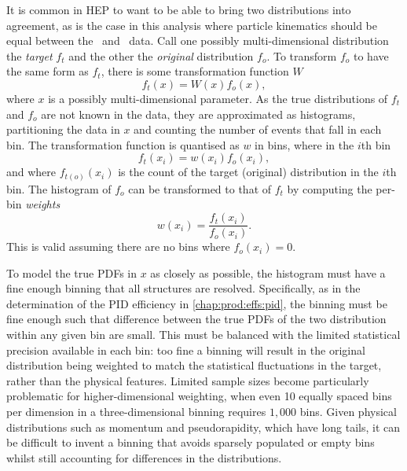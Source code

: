 It is common in \acl{HEP} to want to be able to bring two distributions into 
agreement, as is the case in this analysis where particle kinematics should be 
equal between the \pKK\ and \ppipi\ data.
Call one possibly multi-dimensional distribution the \emph{target} $f_{t}$ and 
the other the \emph{original} distribution $f_{o}$.
To transform $f_{o}$ to have the same form as $f_{t}$, there is some 
transformation function $W$
\begin{equation}
  f_{t}(x) = W(x)f_{o}(x),
\end{equation}
where $x$ is a possibly multi-dimensional parameter.
As the true distributions of $f_{t}$ and $f_{o}$ are not known in the data, 
they are approximated as histograms, partitioning the data in $x$ and counting 
the number of events that fall in each bin.
The transformation function is quantised as $w$ in bins, where in the $i$th bin
\begin{equation}
  f_{t}(x_{i}) = w(x_{i})f_{o}(x_{i}),
\end{equation}
and where $f_{t(o)}(x_{i})$ is the count of the target (original) distribution 
in the $i$th bin.
The histogram of $f_{o}$ can be transformed to that of $f_{t}$ by computing the 
per-bin \emph{weights}
\begin{equation}
  w(x_{i}) = \frac{f_{t}(x_{i})}{f_{o}(x_{i})}.
\end{equation}
This is valid assuming there are no bins where $f_{o}(x_{i}) = 0$.

To model the true \aclp{PDF} in $x$ as closely as possible, the histogram must 
have a fine enough binning that all structures are resolved.
Specifically, as in the determination of the \ac{PID} efficiency in 
\cref{chap:prod:effs:pid}, the binning must be fine enough such that difference 
between the true \acp{PDF} of the two distribution within any given bin are 
small.
This must be balanced with the limited statistical precision available in each 
bin: too fine a binning will result in the original distribution being weighted 
to match the statistical fluctuations in the target, rather than the physical 
features.
Limited sample sizes become particularly problematic for higher-dimensional 
weighting, when even 10 equally spaced bins per dimension in a 
three-dimensional binning requires $1,000$ bins.
Given physical distributions such as momentum and pseudorapidity, which have 
long tails, it can be difficult to invent a binning that avoids sparsely 
populated or empty bins whilst still accounting for differences in the 
distributions.

